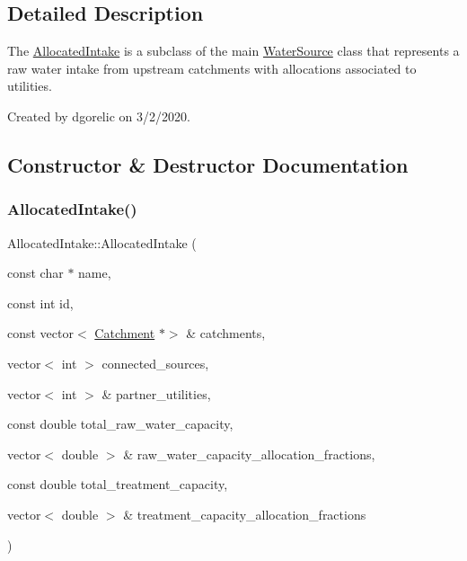 \subsection{Detailed Description}
The {\ttfamily \mbox{\hyperlink{classAllocatedIntake}{Allocated\+Intake}}} is a subclass of the main {\ttfamily \mbox{\hyperlink{classWaterSource}{Water\+Source}}} class that represents a raw water intake from upstream catchments with allocations associated to utilities. 

Created by dgorelic on 3/2/2020. 

\subsection{Constructor \& Destructor Documentation}
\mbox{\label{classAllocatedIntake_a06653dc837c927a68ab809234d78f505}} 
\subsubsection{\texorpdfstring{Allocated\+Intake()}{AllocatedIntake()}\hspace{0.1cm}{\footnotesize\ttfamily [1/2]}}
{\footnotesize\ttfamily Allocated\+Intake\+::\+Allocated\+Intake (\begin{DoxyParamCaption}\item[{const char $\ast$}]{name,  }\item[{const int}]{id,  }\item[{const vector$<$ \mbox{\hyperlink{classCatchment}{Catchment}} $\ast$$>$ \&}]{catchments,  }\item[{vector$<$ int $>$}]{connected\+\_\+sources,  }\item[{vector$<$ int $>$ \&}]{partner\+\_\+utilities,  }\item[{const double}]{total\+\_\+raw\+\_\+water\+\_\+capacity,  }\item[{vector$<$ double $>$ \&}]{raw\+\_\+water\+\_\+capacity\+\_\+allocation\+\_\+fractions,  }\item[{const double}]{total\+\_\+treatment\+\_\+capacity,  }\item[{vector$<$ double $>$ \&}]{treatment\+\_\+capacity\+\_\+allocation\+\_\+fractions }\end{DoxyParamCaption})}



